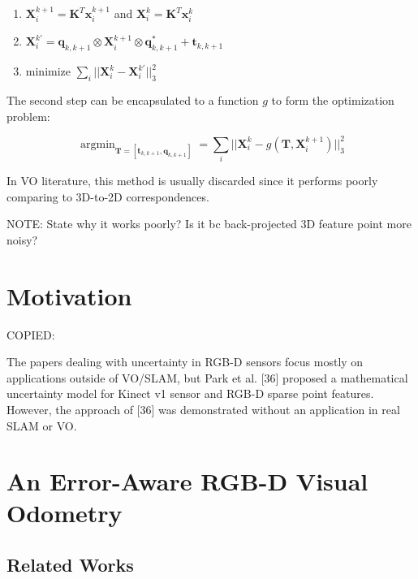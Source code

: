 \documentclass[a4paper]{report}
\numberwithin{figure}{section}
\newcommand{\argmin}{\mathop{\mathrm{argmin}}}
\begin{document}
\begin{enumerate}
  \item $\mathbf{X}_{i}^{k+1} = \mathbf{K}^T\mathbf{x}_{i}^{k+1}$ and 
    $\mathbf{X}_{i}^{k} = \mathbf{K}^T\mathbf{x}_{i}^{k}$ 
  \item $\mathbf{X}_i^{k'} = 
    \mathbf{q}_{k,k+1} \otimes \mathbf{X}_i^{k+1} \otimes \mathbf{q}_{k,k+1}^* + \mathbf{t}_{k,k+1}$
  \item minimize $\sum_i||\mathbf{X}_i^k - \mathbf{X}_i^{k'}||_3^2$
\end{enumerate}

The second step can be encapsulated to a function $g$ to form the optimization 
problem:

\begin{equation}
  \argmin_{\mathbf{T} = [\mathbf{t}_{k,k+1}, \mathbf{q}_{k,k+1}]} = 
  \sum_i||\mathbf{X}_i^k - g(\mathbf{T}, \mathbf{X}_i^{k+1})||^2_3
\end{equation}

In VO literature, this method is usually discarded since 
it performs poorly comparing to 3D-to-2D correspondences.

NOTE: State why it works poorly? Is it bc back-projected 3D feature point more noisy?

\chapter{Motivation} \label{cp_motivation}

COPIED:

The papers dealing with uncertainty in RGB-D sensors focus mostly on 
applications outside of VO/SLAM, but Park et al. 
[36] proposed a mathematical uncertainty model for Kinect v1 sensor and RGB-D 
sparse point features. However, the approach of [36] was 
demonstrated without an application in real SLAM or VO. 

\chapter{An Error-Aware RGB-D Visual Odometry} \label{cp_covo}

\section{Related Works} \label{sc_error_aware_visual_odometry_related_works}
\end{document}
